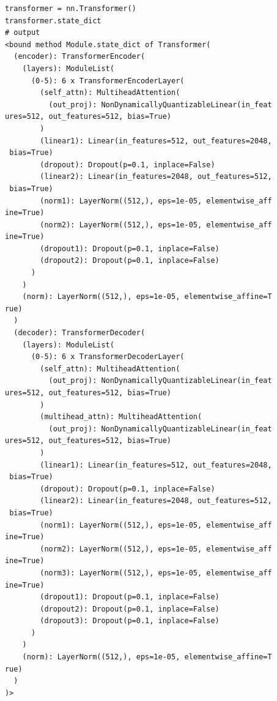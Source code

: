     \begin{lstlisting}
      transformer = nn.Transformer()
      transformer.state_dict
      # output 
      <bound method Module.state_dict of Transformer(
        (encoder): TransformerEncoder(
          (layers): ModuleList(
            (0-5): 6 x TransformerEncoderLayer(
              (self_attn): MultiheadAttention(
                (out_proj): NonDynamicallyQuantizableLinear(in_feat
      ures=512, out_features=512, bias=True)
              )
              (linear1): Linear(in_features=512, out_features=2048,
       bias=True)
              (dropout): Dropout(p=0.1, inplace=False)
              (linear2): Linear(in_features=2048, out_features=512,
       bias=True)
              (norm1): LayerNorm((512,), eps=1e-05, elementwise_aff
      ine=True)
              (norm2): LayerNorm((512,), eps=1e-05, elementwise_aff
      ine=True)
              (dropout1): Dropout(p=0.1, inplace=False)
              (dropout2): Dropout(p=0.1, inplace=False)
            )
          )
          (norm): LayerNorm((512,), eps=1e-05, elementwise_affine=T
      rue)
        )
        (decoder): TransformerDecoder(
          (layers): ModuleList(
            (0-5): 6 x TransformerDecoderLayer(
              (self_attn): MultiheadAttention(
                (out_proj): NonDynamicallyQuantizableLinear(in_feat
      ures=512, out_features=512, bias=True)
              )
              (multihead_attn): MultiheadAttention(
                (out_proj): NonDynamicallyQuantizableLinear(in_feat
      ures=512, out_features=512, bias=True)
              )
              (linear1): Linear(in_features=512, out_features=2048,
       bias=True)
              (dropout): Dropout(p=0.1, inplace=False)
              (linear2): Linear(in_features=2048, out_features=512,
       bias=True)
              (norm1): LayerNorm((512,), eps=1e-05, elementwise_aff
      ine=True)
              (norm2): LayerNorm((512,), eps=1e-05, elementwise_aff
      ine=True)
              (norm3): LayerNorm((512,), eps=1e-05, elementwise_aff
      ine=True)
              (dropout1): Dropout(p=0.1, inplace=False)
              (dropout2): Dropout(p=0.1, inplace=False)
              (dropout3): Dropout(p=0.1, inplace=False)
            )
          )
          (norm): LayerNorm((512,), eps=1e-05, elementwise_affine=T
      rue)
        )
      )>
    \end{lstlisting}

